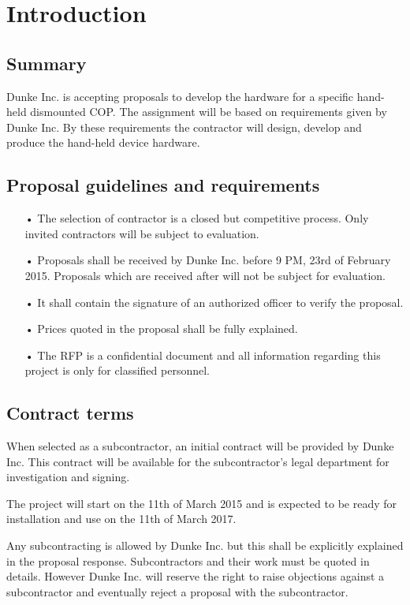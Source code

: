 \chapter{Introduction}
\section{Summary}
Dunke Inc. is accepting proposals to develop the hardware for a specific hand-held dismounted COP. The assignment will be based on requirements given by Dunke Inc. By these requirements the contractor will design, develop and produce the hand-held device hardware. 

\section{Proposal guidelines and requirements}

\begin{enumerate}

\item[•]The selection of contractor is a closed but competitive process. Only invited contractors will be subject to evaluation. 
\item[•]Proposals shall be received by Dunke Inc. before 9 PM, 23rd of February 2015. Proposals which are received after will not be subject for evaluation.
\item[•]It shall contain the signature of an authorized officer to verify the proposal. 
\item[•]Prices quoted in the proposal shall be fully explained.
\item[•]The RFP is a confidential document and all information regarding this project is only for classified personnel. 
\end{enumerate}


\section{Contract terms}
When selected as a subcontractor, an initial contract will be provided by Dunke Inc. This contract will be available for the subcontractor's legal department for investigation and signing. 

The project will start on the 11th of March 2015 and is expected to be ready for installation and use on the 11th of March 2017. 

Any subcontracting is allowed by Dunke Inc. but this shall be explicitly explained in the proposal response. 
Subcontractors and their work must be quoted in details. 
However Dunke Inc. will reserve the right to raise objections against a subcontractor and eventually reject a proposal with the subcontractor. 

